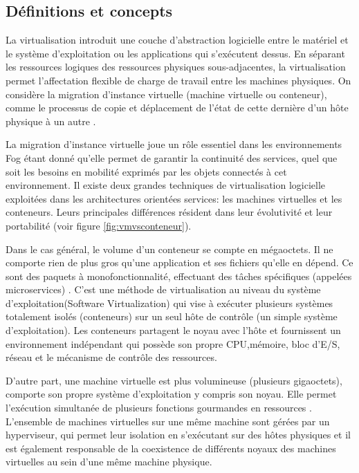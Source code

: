 \subsection{Définitions et concepts}
La virtualisation introduit une couche d'abstraction logicielle entre le matériel et le système d'exploitation ou les applications qui s'exécutent dessus. En séparant les ressources logiques des ressources physiques sous-adjacentes, la virtualisation permet l'affectation flexible de charge de travail entre les machines physiques.
On considère la migration d'instance virtuelle (machine virtuelle ou conteneur), comme le processus de copie et déplacement de l'état de cette dernière d'un hôte physique à un autre \cite{boutaba2013}.\par
La migration d'instance virtuelle joue un rôle essentiel dans les environnements Fog étant donné qu'elle permet de garantir la continuité des services, quel que soit les besoins en mobilité exprimés par les objets connectés à cet environnement.
Il existe deux grandes techniques de virtualisation logicielle exploitées dans les architectures orientées services: les machines virtuelles et les conteneurs. Leurs principales différences résident dans leur évolutivité et leur portabilité \cite{redhat} (voir figure \ref{fig:vmvsconteneur}).\par
Dans le cas général, le volume d'un conteneur se compte en mégaoctets. Il ne comporte rien de plus gros qu'une application et ses fichiers qu'elle en dépend. Ce sont des paquets à monofonctionnalité, effectuant des tâches spécifiques (appelées microservices) \cite{redhat}. C'est une méthode de virtualisation au niveau du système d'exploitation(Software Virtualization) qui vise à exécuter plusieurs systèmes totalement isolés (conteneurs) sur un seul hôte de contrôle (un simple système d'exploitation). Les conteneurs partagent le noyau avec l'hôte et fournissent un environnement indépendant qui possède son propre CPU,mémoire, bloc d'E/S, réseau et le mécanisme de contrôle des ressources.\par
D'autre part, une machine virtuelle est plus volumineuse (plusieurs gigaoctets), comporte son propre système d'exploitation y compris son noyau. Elle permet l'exécution simultanée de plusieurs fonctions gourmandes en ressources \cite{microsoft2019}. L'ensemble de machines virtuelles sur une même machine sont gérées par un hyperviseur, qui permet leur isolation en s'exécutant sur des hôtes physiques et il est également responsable de la coexistence de différents noyaux des machines virtuelles au sein d'une même machine physique.\par
